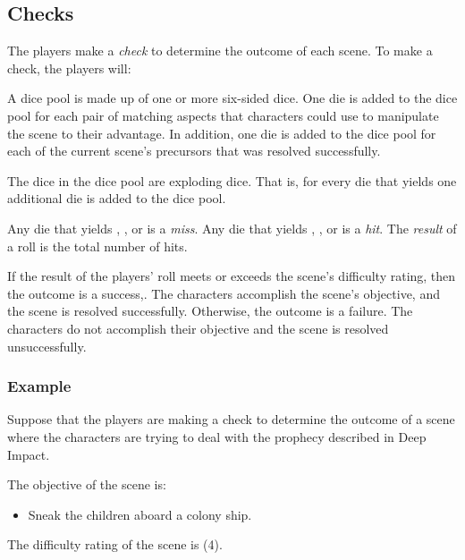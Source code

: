 \documentclass[12pt, a5paper, parskip=half-]{scrartcl}
\begin{document}
\subsection*{Checks}
The players make a \emph{check} to determine the outcome of each scene.
To make a check, the players will:
\begin{description}[labelindent=0.25cm, leftmargin=\widthof{\hspace{0.25cm}\textbullet\space}, font=\normalfont\textbullet\bfseries\space]%
\item[Assemble a Dice Pool]
     A dice pool is made up of one or more six-sided dice.
     One die is added to the dice pool for each pair of matching aspects that characters could use to manipulate the scene to their advantage.
     In addition, one die is added to the dice pool for each of the current scene's precursors that was resolved successfully.
 \item[Roll the Dice]
     The dice in the dice pool are exploding dice.
     That is, for every die that yields  one additional die is added to the dice pool.
\item[Compute the Result]
     Any die that yields , , or  is a \emph{miss}.
     Any die that yields , , or  is a \emph{hit}.
     The \emph{result} of a roll is the total number of hits.
\item[Determine the Outcome]
     If the result of the players' roll meets or exceeds the scene's difficulty rating, then the outcome is a success,.
     The characters accomplish the scene's objective, and the scene is resolved successfully.
     Otherwise, the outcome is a failure.
     The characters do not accomplish their objective and the scene is resolved unsuccessfully.
 \end{description}

\newpage

\subsubsection*{Example}
Suppose that the players are making a check to determine the outcome of a scene where the characters are trying to deal with the prophecy described in {\cinzel \small Deep Impact}.

The objective of the scene is:
\begin{itemize}[leftmargin=\widthof{\hspace{0.25cm}\textbullet\space}, noitemsep,topsep=-1ex]
\item Sneak the children aboard a colony ship.
\end{itemize}
\vspace{1ex}
The difficulty rating of the scene is (4). 
\end{document}
